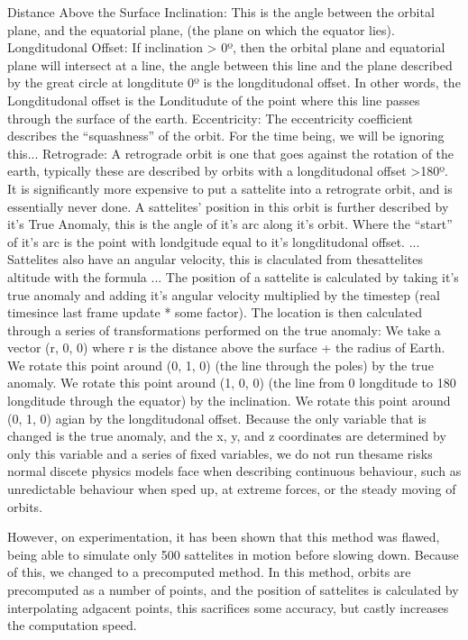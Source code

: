 \documentclass[12pt]{article}
\begin{document}
Distance Above the Surface
Inclination: This is the angle between the orbital plane, and the equatorial plane, (the plane on which the equator lies).
Longditudonal Offset: If inclination > 0º, then the orbital plane and equatorial plane will intersect at a line, the angle between this line and the plane described by the great circle at longditute 0º is the longditudonal offset. In other words, the Longditudonal offset is the Londitudute of the point where this line passes through the surface of the earth.
Eccentricity: The eccentricity coefficient describes the “squashness” of the orbit. For the time being, we will be ignoring this...
Retrograde: A retrograde orbit is one that goes against the rotation of the earth, typically these are described by orbits with a longditudonal offset >180º. It is significantly more expensive to put a sattelite into a retrograte orbit, and is essentially never done.
A sattelites’ position in this orbit is further described by it’s True Anomaly, this is the angle of it’s arc along it’s orbit. Where the “start” of it’s arc is the point with londgitude equal to it’s longditudonal offset.
...
Sattelites also have an angular velocity, this is claculated from thesattelites altitude with the formula
...
The position of a sattelite is calculated by taking it’s true anomaly and adding it’s angular velocity multiplied by the timestep (real timesince last frame update * some factor). The location is then calculated through a series of transformations performed on the true anomaly:
We take a vector (r, 0, 0) where r is the distance above the surface + the radius of Earth.
We rotate this point around (0, 1, 0) (the line through the poles) by the true anomaly.
We rotate this point around (1, 0, 0) (the line from 0 longditude to 180 longditude through the equator) by the inclination.
We rotate this point around (0, 1, 0) agian by the longditudonal offset.
Because the only variable that is changed is the true anomaly, and the x, y, and z coordinates are determined by only this variable and a series of fixed variables, we do not run thesame risks normal discete physics models face when describing continuous behaviour, such as unredictable behaviour when sped up, at extreme forces, or the steady moving of orbits.

However, on experimentation, it has been shown that this method was flawed, being able to simulate only 500 sattelites in motion before slowing down. Because of this, we changed to a precomputed method. In this method, orbits are precomputed as a number of points, and the position of sattelites is calculated by interpolating adgacent points, this sacrifices some accuracy, but castly increases the computation speed.
\end{document}
